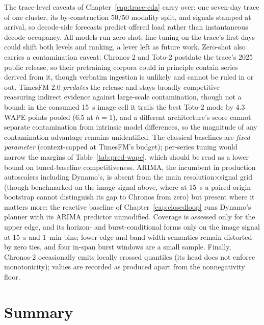 The trace-level caveats of Chapter~\ref{cap:trace-eda} carry over: one
seven-day trace of one cluster, its by-construction 50/50 modality split,
and signals stamped at arrival, so decode-side forecasts predict offered
load rather than instantaneous decode occupancy. All models run zero-shot;
fine-tuning on the trace's first days could shift both levels and ranking,
a lever left as future work. Zero-shot also carries a contamination caveat:
Chronos-2 and Toto-2 postdate the trace's 2025 public release, so their
pretraining corpora could in principle contain series derived from it,
though verbatim ingestion is unlikely and cannot be ruled in or out.
TimesFM-2.0 \emph{predates} the release and
stays broadly competitive --- reassuring indirect evidence against
large-scale contamination, though not a bound: in the consumed
\SI{15}{\second} image cell it trails the best Toto-2 mode by 4.3 WAPE
points pooled (6.5 at $h{=}1$), and a different architecture's score cannot
separate contamination from intrinsic model differences, so the magnitude
of any contamination advantage remains unidentified. The classical
baselines are \emph{fixed-parameter} (context-capped at TimesFM's budget);
per-series tuning would narrow the margins of Table~\ref{tab:pred-wape},
which should be read as a lower bound on tuned-baseline competitiveness.
ARIMA, the incumbent in production autoscalers including Dynamo's, is
absent from the main resolution$\times$signal grid (though benchmarked
on the image signal above, where at \SI{15}{\second} a paired-origin
bootstrap cannot distinguish its gap to Chronos from zero) but present where it
matters more: the reactive baseline of Chapter~\ref{cap:closedloop} runs
Dynamo's planner with its ARIMA predictor unmodified. Coverage is assessed
only for the upper edge, and its horizon- and burst-conditional forms
only on the image signal at \SI{15}{\second}
and \SI{1}{\minute} bins; lower-edge and band-width semantics remain
distorted by zero ties, and four in-span burst windows are a small
sample. Finally, Chronos-2 occasionally emits locally crossed quantiles
(its head does not enforce monotonicity); values are recorded as produced
apart from the nonnegativity floor.

\section{Summary}

